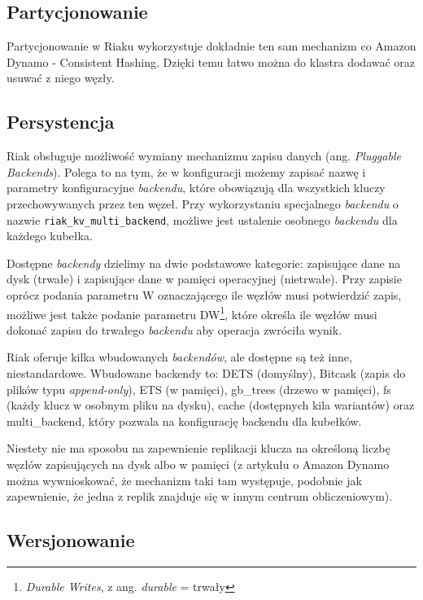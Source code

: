 \subsection*{Partycjonowanie}

Partycjonowanie w Riaku wykorzystuje dokładnie ten sam mechanizm co Amazon Dynamo - Consistent Hashing.
Dzięki temu łatwo można do klastra dodawać oraz usuwać z niego węzły.

\subsection*{Persystencja}

Riak obsługuje możliwość wymiany mechanizmu zapisu danych (ang. \emph{Pluggable Backends}).
Polega to na tym, że w konfiguracji możemy zapisać nazwę i parametry konfiguracyjne \emph{backendu}, które obowiązują dla wszystkich kluczy przechowywanych przez ten węzeł.
Przy wykorzystaniu specjalnego \emph{backendu} o nazwie \verb+riak_kv_multi_backend+, możliwe jest ustalenie osobnego \emph{backendu} dla każdego kubełka.

Dostępne \emph{backendy} dzielimy na dwie podstawowe kategorie: zapisujące dane na dysk (trwałe) i zapisujące dane w pamięci operacyjnej (nietrwałe).
Przy zapisie oprócz podania parametru W oznaczającego ile węzłów musi potwierdzić zapis, możliwe jest także podanie parametru DW\footnote{\emph{Durable Writes}, z ang. \emph{durable} = trwały}, które określa ile węzłów musi dokonać zapisu do trwałego \emph{backendu} aby operacja zwróciła wynik.

Riak oferuje kilka wbudowanych \emph{backendów}, ale dostępne są też inne, niestandardowe.
Wbudowane backendy to: DETS (domyślny), Bitcask (zapis do plików typu \emph{append-only}), ETS (w pamięci), gb\_trees (drzewo w pamięci), fs (każdy klucz w osobnym pliku na dysku), cache (dostępnych kila wariantów) oraz multi\_backend, który pozwala na konfigurację backendu dla kubełków. 

Niestety nie ma sposobu na zapewnienie replikacji klucza na określoną liczbę węzłów zapisujących na dysk albo w pamięci (z artykułu o Amazon Dynamo można wywnioskować, że mechanizm taki tam występuje, podobnie jak zapewnienie, że jedna z replik znajduje się w innym centrum obliczeniowym).

\subsection*{Wersjonowanie}

